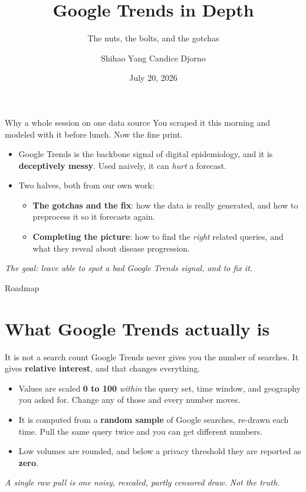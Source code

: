 \documentclass[aspectratio=169,11pt]{beamer}
\title{Google Trends in Depth}
\subtitle{The nuts, the bolts, and the gotchas}
\author{Shihao Yang \quad\textbullet\quad Candice Djorno}
\institute{SISMID 2026 \textbullet\ Day 1, 1:30}
\date{July 20, 2026}
\begin{document}
\begin{frame}
  \titlepage
\end{frame}

\begin{frame}{Why a whole session on one data source}
  You scraped it this morning and modeled with it before lunch. Now the fine print.
  \begin{itemize}
    \item Google Trends is the backbone signal of digital epidemiology, and it is
          \textbf{deceptively messy}. Used naively, it can \emph{hurt} a forecast.
    \item Two halves, both from our own work:
      \begin{itemize}
        \item \textbf{The gotchas and the fix}: how the data is really generated, and how
              to preprocess it so it forecasts again.
        \item \textbf{Completing the picture}: how to find the \emph{right} related
              queries, and what they reveal about disease progression.
      \end{itemize}
  \end{itemize}
  \vspace{0.3em}
  \begin{center}
    \itshape The goal: leave able to spot a bad Google Trends signal, and to fix it.
  \end{center}
\end{frame}

\begin{frame}{Roadmap}
  \tableofcontents
\end{frame}

\section{What Google Trends actually is}

\begin{frame}{It is not a search count}
  Google Trends never gives you the number of searches. It gives \textbf{relative
  interest}, and that changes everything.
  \begin{itemize}
    \item Values are scaled \textbf{0 to 100} \emph{within} the query set, time window,
          and geography you asked for. Change any of those and every number moves.
    \item It is computed from a \textbf{random sample} of Google searches, re-drawn each
          time. Pull the same query twice and you can get different numbers.
    \item Low volumes are rounded, and below a privacy threshold they are reported as
          \textbf{zero}.
  \end{itemize}
  \vspace{0.3em}
  \begin{center}
    \itshape A single raw pull is one noisy, rescaled, partly censored draw. Not the truth.
  \end{center}
\end{frame}
\end{document}
